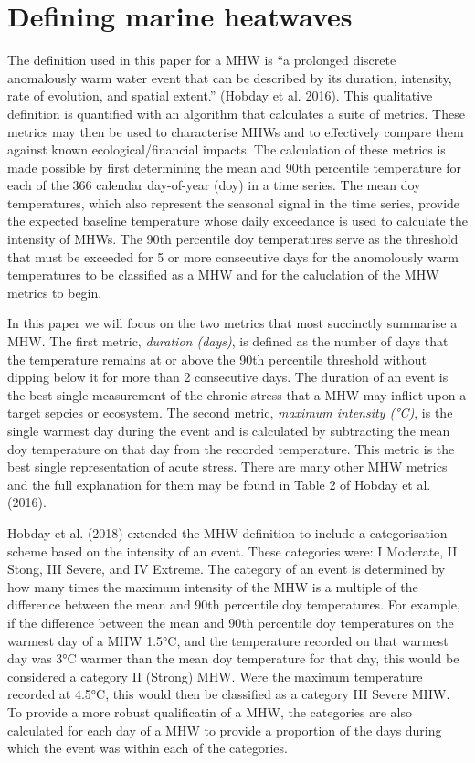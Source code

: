 \documentclass[]{article}
\begin{document}
\hypertarget{defining-marine-heatwaves}{%
\section{Defining marine heatwaves}\label{defining-marine-heatwaves}}

The definition used in this paper for a MHW is ``a prolonged discrete
anomalously warm water event that can be described by its duration,
intensity, rate of evolution, and spatial extent.'' (Hobday et al.
2016). This qualitative definition is quantified with an algorithm that
calculates a suite of metrics. These metrics may then be used to
characterise MHWs and to effectively compare them against known
ecological/financial impacts. The calculation of these metrics is made
possible by first determining the mean and 90th percentile temperature
for each of the 366 calendar day-of-year (doy) in a time series. The
mean doy temperatures, which also represent the seasonal signal in the
time series, provide the expected baseline temperature whose daily
exceedance is used to calculate the intensity of MHWs. The 90th
percentile doy temperatures serve as the threshold that must be exceeded
for 5 or more consecutive days for the anomolously warm temperatures to
be classified as a MHW and for the caluclation of the MHW metrics to
begin.

In this paper we will focus on the two metrics that most succinctly
summarise a MHW. The first metric, \emph{duration (days)}, is defined as
the number of days that the temperature remains at or above the 90th
percentile threshold without dipping below it for more than 2
consecutive days. The duration of an event is the best single
measurement of the chronic stress that a MHW may inflict upon a target
sepcies or ecosystem. The second metric, \emph{maximum intensity (°C)},
is the single warmest day during the event and is calculated by
subtracting the mean doy temperature on that day from the recorded
temperature. This metric is the best single representation of acute
stress. There are many other MHW metrics and the full explanation for
them may be found in Table 2 of Hobday et al. (2016).

Hobday et al. (2018) extended the MHW definition to include a
categorisation scheme based on the intensity of an event. These
categories were: I Moderate, II Stong, III Severe, and IV Extreme. The
category of an event is determined by how many times the maximum
intensity of the MHW is a multiple of the difference between the mean
and 90th percentile doy temperatures. For example, if the difference
between the mean and 90th percentile doy temperatures on the warmest day
of a MHW 1.5°C, and the temperature recorded on that warmest day was 3°C
warmer than the mean doy temperature for that day, this would be
considered a category II (Strong) MHW. Were the maximum temperature
recorded at 4.5°C, this would then be classified as a category III
Severe MHW. To provide a more robust qualificatin of a MHW, the
categories are also calculated for each day of a MHW to provide a
proportion of the days during which the event was within each of the
categories.
\end{document}
